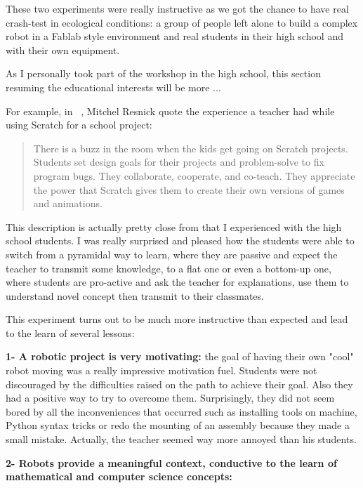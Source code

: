 These two experiments were really instructive as we got the chance to have real crash-test in ecological conditions: a group of people left alone to build a complex robot in a Fablab style environment and real students in their high school and with their own equipment.

As I personally took part of the workshop in the high school, this section resuming the educational interests will be more ...

For example, in ~\cite{resnick2008sowing}, Mitchel Resnick quote the experience a teacher had while using Scratch for a school project:
\begin{quotation}
    There is a buzz in the room when the kids get going on Scratch projects. Students set design goals for their projects and problem-solve to fix program bugs. They collaborate, cooperate, and co-teach. They appreciate the power that Scratch gives them to create their own versions of games and animations.

\end{quotation}

This description is actually pretty close from that I experienced with the high school students. I was really surprised and pleased how the students were able to switch from a pyramidal way to learn, where they are passive and expect the teacher to transmit some knowledge, to a flat one or even a bottom-up one, where students are pro-active and ask the teacher for explanations, use them to understand novel concept then transmit to their classmates.

This experiment turns out to be much more instructive than expected and lead to the learn of several lessons:

\textbf{1- A robotic project is very motivating:} the goal of having their own "cool" robot moving was a really impressive motivation fuel. Students were not discouraged by the difficulties raised on the path to achieve their goal. Also they had a positive way to try to overcome them. Surprisingly, they did not seem bored by all the inconveniences that occurred such as installing tools on machine, Python syntax tricks or redo the mounting of an assembly because they made a small mistake. Actually, the teacher seemed way more annoyed than his students.

\textbf{2- Robots provide a meaningful context, conductive to the learn of mathematical and computer science concepts:}

